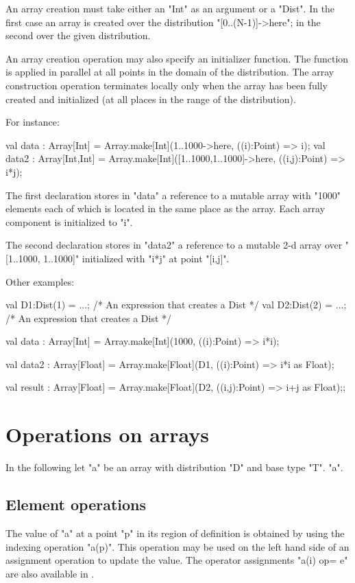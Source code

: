 An array creation 
must take either an \xcd"Int" as an argument or a \xcd"Dist". In the first
case an array is created over the distribution \xcd"[0..(N-1)]->here";
in the second over the given distribution. 

An array creation operation may also specify an initializer
function.
The function is applied in parallel
at all points in the domain of the distribution. The array
construction operation terminates locally only when the array has been
fully created and initialized (at all places in the range of the
distribution).

For instance:
\begin{xten}
val data : Array[Int]
    = Array.make[Int](1..1000->here, ((i):Point) => i);
val data2 : Array[Int,Int]
    = Array.make[Int]([1..1000,1..1000]->here, ((i,j):Point) => i*j);
\end{xten}

{}\noindent 
The first declaration stores in \xcd"data" a reference to a mutable
array with \xcd"1000" elements each of which is located in the
same place as the array. Each array component is initialized to \xcd"i".

The second declaration stores in \xcd"data2" a reference to a mutable
2-d array over \xcd"[1..1000, 1..1000]" initialized with \xcd"i*j"
at point \xcd"[i,j]".

Other examples:
\begin{xten}
val D1:Dist(1) = ...; /* An expression that creates a Dist */
val D2:Dist(2) = ...; /* An expression that creates a Dist */

val data : Array[Int]
    = Array.make[Int](1000, ((i):Point) => i*i);

val data2 : Array[Float]
    = Array.make[Float](D1, ((i):Point) => i*i as Float);

val result : Array[Float]
   = Array.make[Float](D2, ((i,j):Point) => i+j as Float);;
\end{xten}

\section{Operations on arrays}
In the following let \xcd"a" be an array with distribution \xcd"D" and
base type \xcd"T". \xcd"a".

\subsection{Element operations}
The value of \xcd"a" at a point \xcd"p" in its region of definition is
obtained by using the indexing operation \xcd"a(p)". This operation
may be used on the left hand side of an assignment operation to update
the value. The operator assignments \xcd"a(i) op= e" are also available
in \Xten{}.


